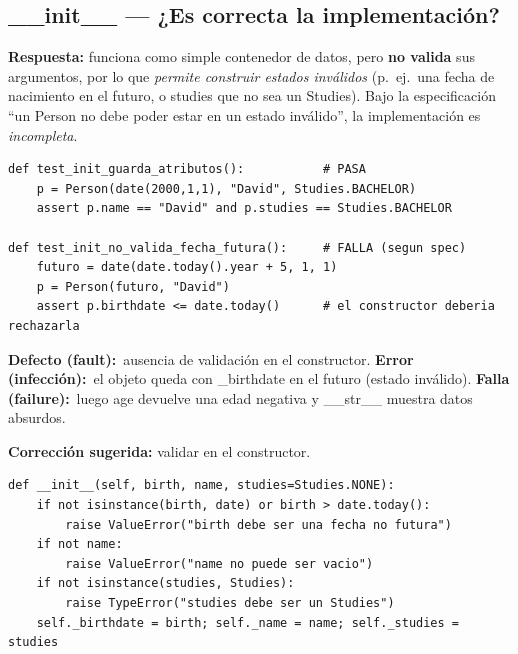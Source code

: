 \documentclass[11pt,a4paper]{article}
\newcommand{\defecto}{\textbf{\textcolor{bad}{Defecto (fault):}}\ }
\newcommand{\error}{\textbf{\textcolor{bad}{Error (infección):}}\ }
\newcommand{\falla}{\textbf{\textcolor{bad}{Falla (failure):}}\ }
\newcommand{\code}[1]{\colorbox{codebg}{\ttfamily\small #1}}
\begin{document}
\subsection{\code{\_\_init\_\_} --- ¿Es correcta la implementación?}
\begin{answer}
\textbf{Respuesta:} funciona como simple contenedor de datos, pero \textbf{no valida} sus argumentos,
por lo que \emph{permite construir estados inválidos} (p.\ ej.\ una fecha de nacimiento en el futuro,
o \code{studies} que no sea un \code{Studies}). Bajo la especificación ``un \code{Person} no debe
poder estar en un estado inválido'', la implementación es \emph{incompleta}.
\end{answer}

\begin{lstlisting}[style=py]
def test_init_guarda_atributos():           # PASA
    p = Person(date(2000,1,1), "David", Studies.BACHELOR)
    assert p.name == "David" and p.studies == Studies.BACHELOR

def test_init_no_valida_fecha_futura():     # FALLA (segun spec)
    futuro = date(date.today().year + 5, 1, 1)
    p = Person(futuro, "David")
    assert p.birthdate <= date.today()      # el constructor deberia rechazarla
\end{lstlisting}

\begin{def-err-fail}
\defecto ausencia de validación en el constructor.\quad
\error el objeto queda con \code{\_birthdate} en el futuro (estado inválido).\quad
\falla luego \code{age} devuelve una edad negativa y \code{\_\_str\_\_} muestra datos absurdos.
\end{def-err-fail}

\begin{answer}\small\textbf{Corrección sugerida:} validar en el constructor.
\begin{lstlisting}[style=py]
def __init__(self, birth, name, studies=Studies.NONE):
    if not isinstance(birth, date) or birth > date.today():
        raise ValueError("birth debe ser una fecha no futura")
    if not name:
        raise ValueError("name no puede ser vacio")
    if not isinstance(studies, Studies):
        raise TypeError("studies debe ser un Studies")
    self._birthdate = birth; self._name = name; self._studies = studies
\end{lstlisting}
\end{answer}

\end{document}
